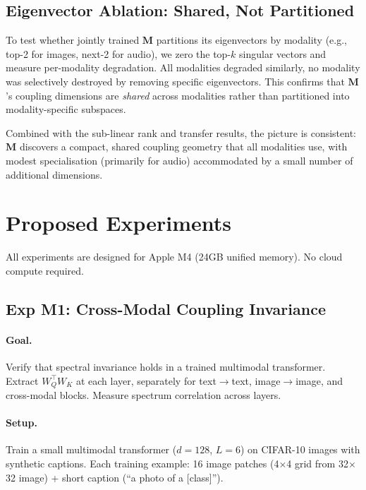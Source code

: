 \documentclass[11pt, a4paper]{article}
\newcommand{\M}{\mathbf{M}}
\theoremstyle{plain}
\theoremstyle{remark}
\begin{document}
\subsection{Eigenvector Ablation: Shared, Not Partitioned}\label{sec:eigenvector-ablation}

To test whether jointly trained $\M$ partitions its eigenvectors by modality (e.g., top-2 for images, next-2 for audio), we zero the top-$k$ singular vectors and measure per-modality degradation.
All modalities degraded similarly, no modality was selectively destroyed by removing specific eigenvectors.
This confirms that $\M$'s coupling dimensions are \emph{shared} across modalities rather than partitioned into modality-specific subspaces.

Combined with the sub-linear rank and transfer results, the picture is consistent: $\M$ discovers a compact, shared coupling geometry that all modalities use, with modest specialisation (primarily for audio) accommodated by a small number of additional dimensions.

\section{Proposed Experiments}

All experiments are designed for Apple M4 (24GB unified memory).
No cloud compute required.

\subsection{Exp M1: Cross-Modal Coupling Invariance}

\paragraph{Goal.}
Verify that spectral invariance holds in a trained multimodal transformer.
Extract $W_Q^\top W_K$ at each layer, separately for text$\to$text, image$\to$image, and cross-modal blocks.
Measure spectrum correlation across layers.

\paragraph{Setup.}
Train a small multimodal transformer ($d = 128$, $L = 6$) on CIFAR-10 images with synthetic captions.
Each training example: 16 image patches (4$\times$4 grid from 32$\times$32 image) + short caption (``a photo of a [class]'').
\end{document}
